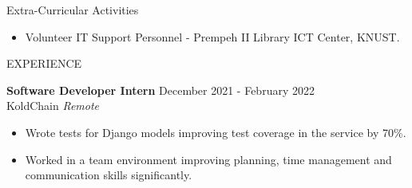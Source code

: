 \documentclass{resume} %
\begin{document}
\begin{rSection}{Extra-Curricular Activities} 
\begin{itemize}
    \item 	Volunteer IT Support Personnel - Prempeh II Library ICT Center, KNUST.
\end{itemize}


\end{rSection}

\begin{rSection}{EXPERIENCE}

\textbf{Software Developer Intern} \hfill December 2021 - February 2022\\
KoldChain \hfill \textit{Remote}
 \begin{itemize}
    \itemsep -3pt {} 
     \item Wrote tests for Django models improving test coverage in the service by 70\%.
     \item Worked in a team environment improving planning, time management and communication skills significantly.
 \end{itemize}
 

\end{rSection} 


\end{document}
